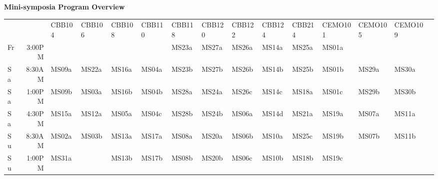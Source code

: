 \clearpage
\begin{center}
{\large {\bf Mini-symposia Program Overview}}

\vspace{0.5cm}
\begin{adjustbox}{width=\textwidth}
\begin{tabular}{lrlllllllllllll}
                         &        & CBB104 & CBB106 & CBB108 & CBB110 & CBB118 & CBB120 & CBB122 & CBB124 & CBB214 & CEMO101 & CEMO105 & CEMO109 \\
\rowcolor{p1color!20} Fr & 3:00PM &        &        &        &        & MS23a  & MS27a  & MS26a  & MS14a  & MS25a  & MS01a   &         &         \\
\rowcolor{p2color!30} Sa & 8:30AM & MS09a  & MS22a  & MS16a  & MS04a  & MS23b  & MS27b  & MS26b  & MS14b  & MS25b  & MS01b   & MS29a   & MS30a   \\
\rowcolor{p2color!20} Sa & 1:00PM & MS09b  & MS03a  & MS16b  & MS04b  & MS28a  & MS24a  & MS26c  & MS14c  & MS18a  & MS01c   & MS29b   & MS30b   \\
\rowcolor{p2color!10} Sa & 4:30PM & MS15a  & MS12a  & MS05a  & MS04c  & MS28b  & MS24b  & MS06a  & MS14d  & MS21a  & MS19a   & MS07a   & MS11a   \\
\rowcolor{p3color!30} Su & 8:30AM & MS02a  & MS03b  & MS13a  & MS17a  & MS08a  & MS20a  & MS06b  & MS10a  & MS25c  & MS19b   & MS07b   & MS11b   \\
\rowcolor{p3color!20} Su & 1:00PM & MS31a  &        & MS13b  & MS17b  & MS08b  & MS20b  & MS06c  & MS10b  & MS18b  & MS19c   &         &         \\
\end{tabular}
\end{adjustbox}
\vspace{2cm}



\end{center}
